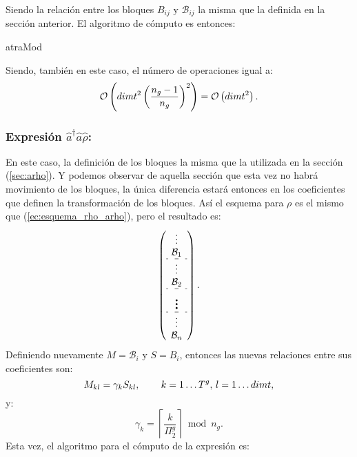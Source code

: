\quad Siendo la relaci\'on entre los bloques $B_{ij}$ y $\mathcal{B}_{ij}$ la misma que la definida en la secci\'on anterior. El algoritmo de c\'omputo es entonces:

\begin{algorithm}[H]
\caption{atraMod}\label{algo:atraMod}
\LinesNumbered
{}
\end{algorithm}
\quad Siendo, tambi\'en en este caso, el n\'umero de operaciones igual a: $$\mathcal{O}\left(dimt^2\left(\frac{n_g-1}{n_g}\right)^2\right)=\mathcal{O}\left(dimt^2\right).$$
\subsubsection*{Expresi\'on $\hat{a}^{\dag}\hat{a}\hat{\rho}$: }En este caso, la definici\'on de los bloques la misma que la utilizada en la secci\'on (\ref{sec:arho}). Y podemos observar de aquella secci\'on que esta vez no habr\'a movimiento de los bloques, la \'unica diferencia estar\'a entonces en los coeficientes que definen la transformaci\'on de los bloques. As\'i el esquema para $\rho$ es el mismo que (\ref{ec:esquema_rho_arho}), pero el resultado es:\begin{equation}\left(
 \begin{array}{c}
\vdots\\
\mathcal{B}_{1} \\\hdashline
\vdots\\
\mathcal{B}_{2}\\\hdashline
\multirow{2}{*}{\Huge$\vdots$}\\
\\\hdashline
\vdots\\
\mathcal{B}_{n}
 \end{array}\right).
\end{equation}
Definiendo nuevamente $M=\mathcal{B}_{i}$ y $S=B_{i}$, entonces las nuevas relaciones entre sus coeficientes son:\begin{equation}
M_{kl}=\gamma_{k}S_{kl},\,\qquad k=1\ldots T^g,\,l=1\ldots dimt, \label{ec:subbloque_atarM}
\end{equation}
y:\begin{equation}
 \gamma_{k}=\left\lceil \frac{k}{\Pi_2^g} \right\rceil\bmod n_g.\label{ec:coef_gammas_atarMod}
\end{equation}
\quad Esta vez, el algoritmo para el c\'omputo de la expresi\'on es:

